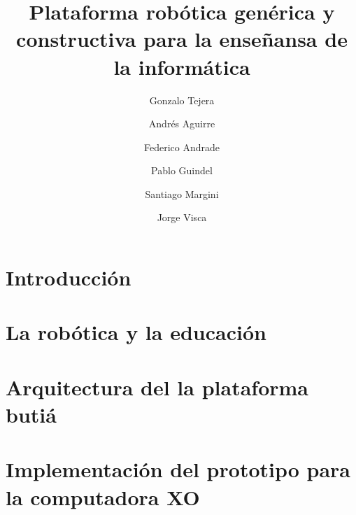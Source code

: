 \documentclass{llncs}
\begin{document}
%
%
\title{Plataforma rob\'otica gen\'erica y constructiva para la ense\~nansa de la inform\'atica} 
%
%
\author{
Gonzalo Tejera
\and Andr\'es Aguirre
\and Federico Andrade
\and Pablo Guindel
\and Santiago Margini
\and Jorge Visca
}
%
%

\maketitle              %
\setcounter{footnote}{0}
\begin{abstract}

\end{abstract}
\section{Introducci\'on}
\label{intro}

\section{La rob\'otica y la educaci\'on}
\label{robyedu}

\section{Arquitectura del la plataforma buti\'a}
\label{arq}

\section{Implementaci\'on del prototipo para la computadora XO}
\label{proto}

\end{document}
